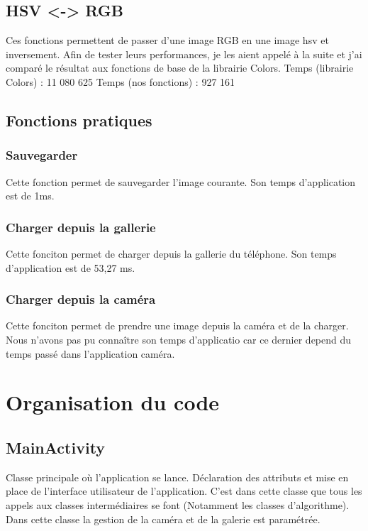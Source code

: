 \documentclass{article}
\begin{document}
\subsection{HSV <-> RGB}
Ces fonctions permettent de passer d'une image RGB en une image hsv et inversement. Afin de tester leurs performances, je les aient appelé à la suite et j'ai comparé le résultat aux fonctions de base de la librairie Colors.
\medbreak
Temps (librairie Colors) : 11 080 625
\medbreak
Temps (nos fonctions) : 927 161

\subsection{Fonctions pratiques}
\subsubsection{Sauvegarder}
Cette fonction permet de sauvegarder l'image courante. Son temps d'application est de 1ms.
\bigbreak

\subsubsection{Charger depuis la gallerie}
Cette fonciton permet de charger depuis la gallerie du téléphone. Son temps d'application est de 53,27 ms.
\bigbreak

\subsubsection{Charger depuis la caméra}
Cette fonciton permet de prendre une image depuis la caméra et de la charger. Nous n'avons pas pu connaître son temps d'applicatio car ce dernier depend du temps passé dans l'application caméra.

\section{Organisation du code}
\subsection{MainActivity}
\medbreak

Classe principale où l'application se lance. Déclaration des attributs et mise en place de l'interface utilisateur de l'application. C'est dans cette classe que tous les appels aux classes intermédiaires se font (Notamment les classes d'algorithme). Dans cette classe la gestion de la caméra et de la galerie est paramétrée.
\bigbreak
\end{document}
